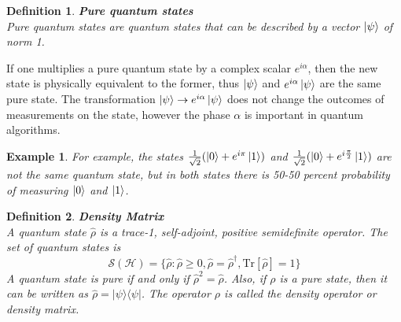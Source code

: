 \documentclass[12pt, a4paper]{article}
\newcommand{\ketbra}[2]{|#1\rangle\langle#2|}
\newcommand{\Tr}[1]{\mathrm{Tr}\left[#1\right]}
\newtheorem*{example*}{Example}
\newtheorem{definition}{Definition}
\begin{document}
\begin{definition}
    \textbf{Pure quantum states}\\
    Pure quantum states are quantum states that can be described by a vector $\ket\psi$ of norm 1. 
\end{definition}
If one multiplies a pure quantum state by a complex scalar $e^{i\alpha}$, then the new state is 
physically equivalent to the former, thus $\ket\psi$ and $e^{i\alpha}\ket\psi$ are 
the same pure state.
The transformation $\ket\psi\rightarrow e^{i\alpha}\ket\psi$ does not change the outcomes of measurements on the state,
however the phase $\alpha$ is important in quantum algorithms.
\begin{example*}
    For example, the states $\frac{1}{\sqrt 2}(\ket 0 + e^{i\pi}\ket 1)$ and $\frac{1}{\sqrt 2}(\ket 0 + e^{i\frac{\pi}{2}}\ket 1)$
    are not the same quantum state, but in both states there is 50-50 percent probability of measuring $\ket 0$ and $\ket 1$.
\end{example*}

\begin{definition}
    \textbf{Density Matrix}\\
    A quantum state $\hat\rho$ is a trace-1, self-adjoint, positive semidefinite operator.
    The set of quantum states is
    \begin{equation*}
        \mathcal{S(H)} = \{ \hat\rho : \hat\rho \geq 0, \hat\rho=\hat\rho^{\dagger}, \Tr{\hat\rho} = 1 \}
    \end{equation*}
    A quantum state is pure if and only if $\hat\rho^2=\hat\rho$. 
    Also, if $\rho$ is a pure state, then it can be written as $\hat\rho = \ketbra{\psi}{\psi}$.
    The operator $\rho$ is called the \textit{density operator} or \textit{density matrix}.
    \label{def:densityop}
\end{definition}
\end{document}
